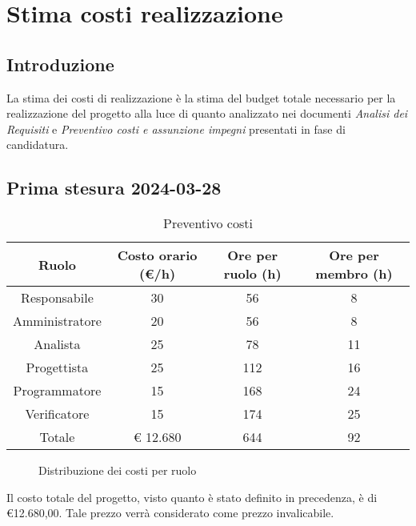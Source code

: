 
\section{Stima costi realizzazione}
\subsection{Introduzione}
La stima dei costi di realizzazione è la stima del budget totale necessario per la realizzazione del progetto alla luce di quanto analizzato nei documenti \textit{Analisi dei Requisiti} e \textit{Preventivo costi e assunzione impegni} presentati in fase di candidatura.
\subsection{Prima stesura 2024-03-28}
\begin{table}[!h]
	\centering
		\begin{tabular}{ | c | c | c | c | }
			\hline
			\textbf{Ruolo}   & \textbf{Costo orario (€/h)} & \textbf{Ore per ruolo (h)} & \textbf{Ore per membro (h)} \\
			\hline
			Responsabile   & 30           & 56            & 8              \\
			Amministratore & 20           & 56            & 8              \\
			Analista       & 25           & 78            & 11             \\
			Progettista    & 25           & 112           & 16             \\
			Programmatore  & 15           & 168           & 24             \\
			Verificatore   & 15           & 174           & 25             \\
			\hline
			Totale         & € 12.680     & 644           & 92             \\
			\hline
		\end{tabular}
        \caption{Preventivo costi}
    \label{tab:12}
\end{table}
\begin{figure}[!h]
    \centering
    \caption{Distribuzione dei costi per ruolo}
    \label{fig:1}
\end{figure}
\begin{flushleft}
Il costo totale del progetto, visto quanto è stato definito in precedenza, è di €12.680,00. Tale prezzo verrà considerato come prezzo invalicabile.
\end{flushleft}
